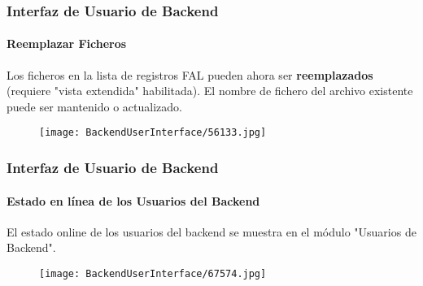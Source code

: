 \begin{frame}[fragile]
	\frametitle{Interfaz de Usuario de Backend}
	\framesubtitle{Reemplazar Ficheros}

	Los ficheros en la lista de registros FAL pueden ahora ser \textbf{reemplazados} (requiere "vista extendida" habilitada).
	El nombre de fichero del archivo existente puede ser mantenido o actualizado.

	\begin{figure}
		\texttt{[image: BackendUserInterface/56133.jpg]}
	\end{figure}

\end{frame}

\begin{frame}[fragile]
	\frametitle{Interfaz de Usuario de Backend}
	\framesubtitle{Estado en línea de los Usuarios del Backend}

	El estado online de los usuarios del backend se muestra en el módulo "Usuarios de Backend".

	\begin{figure}
		\texttt{[image: BackendUserInterface/67574.jpg]}
	\end{figure}

\end{frame}

